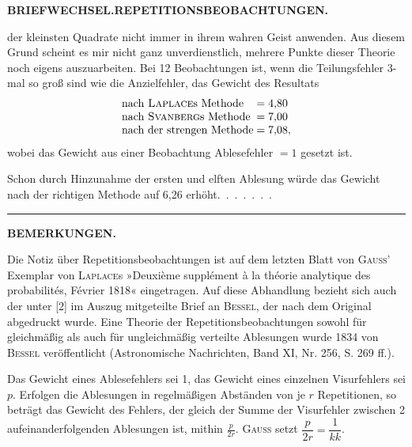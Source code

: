 \par\clearpage
\noindent{}\hfill{\small\textbf{BRIEFWECHSEL.\quad REPETITIONSBEOBACHTUNGEN.}}\hfill\null\par\medskip
\noindent der kleinsten Quadrate nicht immer in ihrem wahren Geist anwenden. Aus diesem Grund scheint es mir nicht ganz unverdienstlich, mehrere Punkte dieser Theorie noch eigens auszuarbeiten. Bei 12 Beobachtungen ist, wenn die Teilungsfehler 3-mal so groß sind wie die Anzielfehler, das Gewicht des Resultats
\[
\begin{array}{l@{\;}c@{\;}l}
\text{nach \textsc{Laplace}s Methode}&=&4{,}80\\
\text{nach \textsc{Svanberg}s Methode}&=&7{,}00\\
\text{nach der strengen Methode}&=&7{,}08,
\end{array}
\]
\noindent wobei das Gewicht aus einer Beobachtung  Ablesefehler $=1$ gesetzt ist.
\par\noindent\hspace*{\parindent}Schon durch Hinzunahme der ersten und elften Ablesung würde das Gewicht nach der richtigen Methode auf 6,26 erhöht.\ .\ .\ .\ .\ .\ .
\begin{center}\rule{2.7cm}{.4pt}\end{center}
\begingroup\small
\begin{center}\textbf{BEMERKUNGEN.}\end{center}
\par\noindent\hspace*{\parindent}Die Notiz über Repetitionsbeobachtungen ist auf dem letzten Blatt von \textsc{Gauss}' Exemplar von \textsc{Laplace}s »Deuxième supplément à la théorie analytique des probabilités, Février 1818« eingetragen. Auf diese Abhandlung bezieht sich auch der unter [2] im Auszug mitgeteilte Brief an \textsc{Bessel}, der nach dem Original abgedruckt wurde. Eine Theorie der Repetitionsbeobachtungen sowohl für gleichmäßig als auch für ungleichmäßig verteilte Ablesungen wurde 1834 von \textsc{Bessel} veröffentlicht (Astronomische Nachrichten, Band XI, Nr. 256, S. 269 ff.).
\par\noindent\hspace*{\parindent}Das Gewicht eines Ablesefehlers sei 1, das Gewicht eines einzelnen Visurfehlers sei $p$. Erfolgen die Ablesungen in regelmäßigen Abständen von je $r$ Repetitionen, so beträgt das Gewicht des Fehlers, der gleich der Summe der Visurfehler zwischen 2 aufeinanderfolgenden Ablesungen ist, mithin $\frac{p}{2r}$. \textsc{Gauss} setzt $\dfrac{p}{2r}=\dfrac1{kk}$.
